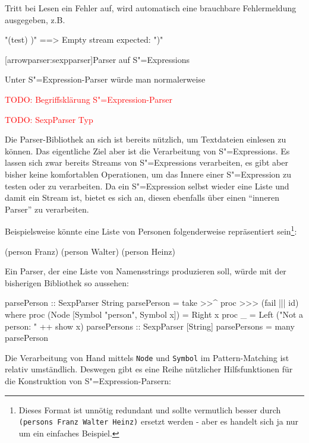 \documentclass[11pt, a4paper, bibgerm]{scrbook}
\newcommand\icode[1]{\lstinline?#1?}
\newcommand{\todo}[1]{
  \textcolor{red}{TODO: #1}
}
\newcommand\lsection{}
\newcommand{\sexp}{S"=Expression}
\newcommand{\sexps}{S"=Expressions}
\begin{document}
Tritt bei Lesen ein Fehler auf, wird automatisch eine brauchbare Fehlermeldung
ausgegeben, z.B.

\begin{code}
"(test) )"  ==>  Empty stream expected: ")"
\end{code}

\lsection[arrowparser:sexpparser]{Parser auf \sexps}

Unter \sexp{}-Parser würde man normalerweise

\todo{Begriffsklärung \sexp{}-Parser}

\todo{SexpParser Typ}

Die Parser-Bibliothek an sich ist bereits nützlich, um Textdateien
einlesen zu können. Das eigentliche Ziel aber ist die Verarbeitung von
\sexps{}. Es lassen sich zwar bereits Streams von \sexps{} verarbeiten,
es gibt aber bisher keine komfortablen Operationen, um das Innere einer
\sexp{} zu testen oder zu verarbeiten. Da ein \sexp{} selbst wieder eine
Liste und damit ein Stream ist, bietet es sich an, diesen ebenfalls über
einen "`inneren Parser"' zu verarbeiten.

Beispielsweise könnte eine Liste von Personen folgenderweise
repräsentiert sein\footnote{Dieses Format ist unnötig redundant und
  sollte vermutlich besser durch \icode{(persons Franz Walter Heinz)} ersetzt
  werden - aber es handelt sich ja nur um ein einfaches Beispiel.}:
\begin{code}
(person Franz)
(person Walter)
(person Heinz)
\end{code}

Ein Parser, der eine Liste von Namensstrings produzieren soll, würde mit
der bisherigen Bibliothek so aussehen:

\begin{code}
parsePerson :: SexpParser String
parsePerson = take >>^ proc >>> (fail ||| id)
  where proc (Node [Symbol "person", Symbol x]) = Right x
        proc _ = Left ("Not a person: " ++ show x)
parsePersons :: SexpParser [String]
parsePersons = many parsePerson
\end{code} %

Die Verarbeitung von Hand mittels \icode{Node} und \icode{Symbol} im
Pattern-Matching ist relativ umständlich. Deswegen gibt es eine Reihe
nützlicher Hilfsfunktionen für die Konstruktion von \sexp{}-Parsern:
\end{document}
